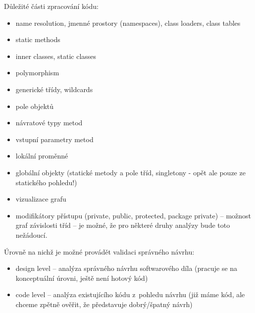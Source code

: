 Důležité části zpracování kódu:
\begin{itemize}
\item name resolution, jmenné prostory (namespaces), class loaders, class tables
\item static methods
\item inner classes, static classes
\item polymorphism
\item generické třídy, wildcards
\item pole objektů
\item návratové typy metod
\item vstupní parametry metod
\item lokální proměnné
\item globální objekty (statické metody a pole tříd, singletony - opět ale pouze ze statického pohledu!)
\item vizualizace grafu
\item modifikátory přístupu (private, public, protected, package private) -- možnost  graf závislosti tříd -- je možné, že pro některé druhy analýzy bude toto nežádoucí.
\end{itemize}

Úrovně na nichž je možné provádět validaci správného návrhu:
\begin{itemize}
\item design level -- analýza správného návrhu softwarového díla (pracuje se na konceptuální úrovni, ještě není hotový kód)
\item code level -- analýza existujícího kódu z~pohledu návrhu (již máme kód, ale chceme zpětně ověřit, že představuje dobrý/špatný návrh)
\end{itemize}



